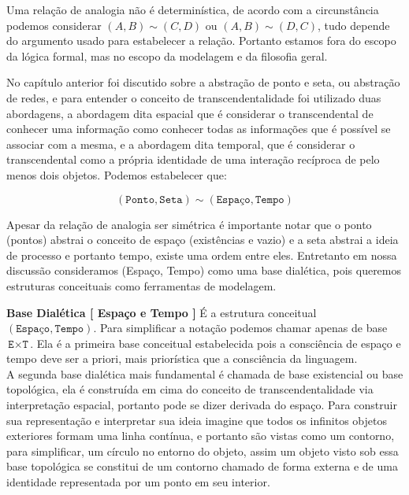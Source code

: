 \documentclass[10pt,a4paper]{report}
\begin{document}
Uma relação de analogia não é determinística, de acordo com a circunstância podemos considerar $(A,B) \sim (C,D)$ ou $(A,B) \sim (D,C)$, tudo depende do argumento usado para estabelecer a relação. Portanto estamos fora do escopo da lógica formal, mas no escopo da modelagem e da filosofia geral.

\hspace{\baselineskip}

No capítulo anterior foi discutido sobre a abstração de ponto e seta, ou abstração de redes, e para entender o conceito de transcendentalidade foi utilizado duas abordagens, a abordagem dita espacial que é considerar o transcendental de conhecer uma informação como conhecer todas as informações que é possível se associar com a mesma, e a abordagem dita temporal, que é considerar o transcendental como a própria identidade de uma interação recíproca de pelo menos dois objetos. Podemos estabelecer que:

$$ (\texttt{Ponto}, \texttt{Seta}) \sim ( \texttt{Espaço} , \texttt{Tempo} ) $$

Apesar da relação de analogia ser simétrica é importante notar que o ponto (pontos) abstrai o conceito de espaço (existências e vazio) e a seta abstrai a ideia de processo e portanto tempo, existe uma ordem entre eles. Entretanto em nossa discussão consideramos (Espaço, Tempo) como uma base dialética, pois queremos estruturas conceituais como ferramentas de modelagem.

% 
\hspace{\baselineskip}

\textbf{Base Dialética [ Espaço e Tempo ]} É a estrutura conceitual $(\texttt{Espaço}, \texttt{Tempo})$. Para simplificar a notação podemos chamar apenas de base $\texttt{E} \times \texttt{T}$. Ela é a primeira base conceitual estabelecida pois a consciência de espaço e tempo deve ser a priori, mais priorística que a consciência da linguagem.\\

A segunda base dialética mais fundamental é chamada de base existencial ou base topológica, ela é construída em cima do conceito de transcendentalidade via interpretação espacial, portanto pode se dizer derivada do espaço. Para construir sua representação e interpretar sua ideia imagine que todos os infinitos objetos exteriores formam uma linha contínua, e portanto são vistas como um contorno, para simplificar, um círculo no entorno do objeto, assim um objeto visto sob essa base topológica se constitui de um contorno chamado de forma externa e de uma identidade representada por um ponto em seu interior. \\
\end{document}
